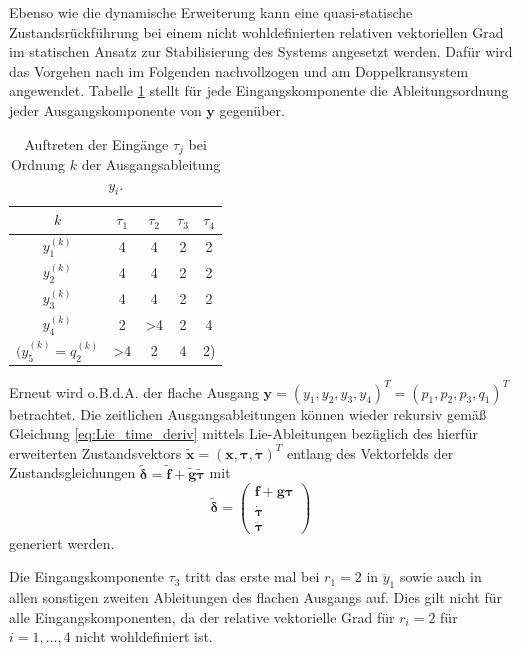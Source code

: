 Ebenso wie die dynamische Erweiterung kann eine quasi-statische Zustandsrückführung bei einem nicht wohldefinierten relativen vektoriellen Grad im statischen Ansatz zur Stabilisierung des Systems angesetzt werden. Dafür wird das Vorgehen nach \cite[S. 206]{NLRT_Roebenack} im Folgenden nachvollzogen und am Doppelkransystem angewendet. Tabelle \ref{tab:input_occurence} stellt für jede Eingangskomponente die Ableitungsordnung jeder Ausgangskomponente von $\mathbf{y}$ gegenüber.

\begin{table}[htbp]%
	\centering
	\caption{Auftreten der Eingänge $\tau_j$ bei Ordnung $k$ der Ausgangsableitung $y_i$.}
	\label{tab:input_occurence}
	\begin{tabular}{ c| c c c c } 
		$k$ & $\tau_1$ & $\tau_2$ & $\tau_3$ & $\tau_4$ \\ 
		\hline
		$y_1^{(k)}$ & 4 & 4 & 2 & 2\\ 
		$y_2^{(k)}$ & 4 & 4 & 2 & 2\\
		$y_3^{(k)}$ & 4 & 4 & 2 & 2\\		
		$y_4^{(k)}$ & 2 & >4 & 2 & 4\\
		$(y_5^{(k)} = q_2^{(k)}$ & >4 & 2 & 4 & 2)\\
		\bottomrule
	\end{tabular}
\end{table}

Erneut wird o.B.d.A. der flache Ausgang ${\mathbf{y} = (y_1, y_2, y_3, y_4)^T = (p_1, p_2, p_3, q_1)^T}$ betrachtet. Die zeitlichen Ausgangsableitungen können wieder rekursiv gemäß Gleichung \eqref{eq:Lie_time_deriv} mittels Lie-Ableitungen bezüglich des hierfür erweiterten Zustandsvektors $\tilde{\mathbf{x}} = (\mathbf{x}, \boldsymbol{\tau}, \dot{\boldsymbol{\tau}})^T$ entlang des Vektorfelds der Zustandsgleichungen $\tilde{\boldsymbol{\delta}} = \tilde{\mathbf{f}} + \tilde{\mathbf{g}} \tilde{\boldsymbol{\tau}}$ mit
\begin{equation}
\tilde{\boldsymbol{\delta}} =
\left(\begin{matrix}
\mathbf{f} + \mathbf{g} \boldsymbol{\tau}\\
\dot{\boldsymbol{\tau}} \\
\ddot{\boldsymbol{\tau}}
\end{matrix}\right)
\end{equation}
generiert werden.

Die Eingangskomponente $\tau_3$ tritt das erste mal bei $r_1 = 2$ in $\ddot{y}_1$ sowie auch in allen sonstigen zweiten Ableitungen des flachen Ausgangs auf. Dies gilt nicht für alle Eingangskomponenten, da der relative vektorielle Grad für $r_i = 2$ für $i = 1, ..., 4$ nicht wohldefiniert ist.

